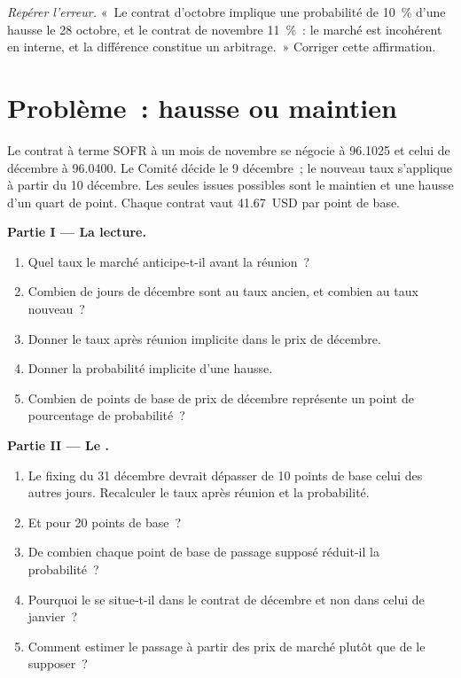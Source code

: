 \begin{exercise}[$\star\star\star$]\label{exo:m2:short-term-interest-rate-futures:8}
\emph{Repérer l'erreur.} «~Le contrat d'octobre implique une probabilité de 10~\% d'une hausse
le 28 octobre, et le contrat de novembre 11~\%~: le marché est incohérent en interne,
et la différence constitue un arbitrage.~» Corriger cette affirmation.
\end{exercise}

\section{Problème~: hausse ou maintien}

\begin{problem}\label{pb:m2:short-term-interest-rate-futures:1}
Le contrat à terme SOFR à un mois de novembre se négocie à 96.1025 et celui de décembre à
96.0400. Le Comité décide le 9 décembre~; le nouveau taux s'applique à partir du 10
décembre. Les seules issues possibles sont le maintien et une hausse d'un quart de point.
Chaque contrat vaut 41.67~USD par point de base.

\medskip\noindent\textbf{Partie I --- La lecture.}
\begin{enumerate}
\item Quel taux le marché anticipe-t-il avant la réunion~?
\item Combien de jours de décembre sont au taux ancien, et combien au taux nouveau~?
\item Donner le taux après réunion implicite dans le prix de décembre.
\item Donner la probabilité implicite d'une hausse.
\item Combien de points de base de prix de décembre représente un point de
pourcentage de probabilité~?
\end{enumerate}

\medskip\noindent\textbf{Partie II --- Le .}
\begin{enumerate}[resume]
\item Le fixing du 31 décembre devrait dépasser de 10 points de base celui des autres jours.
Recalculer le taux après réunion et la probabilité.
\item Et pour 20 points de base~?
\item De combien chaque point de base de passage supposé réduit-il la probabilité~?
\item Pourquoi le  se situe-t-il dans le contrat de décembre et non dans celui de janvier~?
\item Comment estimer le passage à partir des prix de marché plutôt que de le supposer~?
\end{enumerate}


\end{problem}
